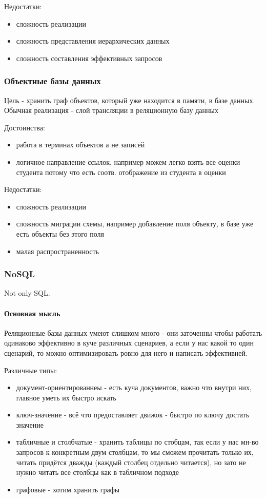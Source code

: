 Недостатки:
\begin{itemize}
    \item сложность реализации
    \item сложность представления иерархических данных
    \item сложность составления эффективных запросов
\end{itemize}

\subsubsection{Объектные базы данных}
Цель - хранить граф объектов, который уже находится
в памяти, в базе данных. Обычная реализация - слой
трансляции в реляционную базу данных

\enewline

Достоинства:
\begin{itemize}
    \item работа в терминах объектов а не записей
    \item логичное направление ссылок, например
можем легко взять все оценки студента потому что есть
соотв. отображение из студента в оценки
\end{itemize}

Недостатки:
\begin{itemize}
    \item сложность реализации
    \item сложность миграции схемы, например добавление
поля объекту, в базе уже есть объекты без этого поля
    \item малая распространенность
\end{itemize}

\subsubsection{NoSQL}
Not only SQL. \\
\paragraph{Основная мысль}
Реляционные базы данных умеют слишком много - они заточенны чтобы работать одинаково
эффективно в куче различных сценариев, а если у нас какой то один сценарий, то можно
оптимизировать ровно для него и написать эффективней.

\enewline

Различные типы:
\begin{itemize}
    \item  документ-ориентированнеы - есть куча документов, важно что внутри них, главное
уметь их быстро искать
    \item ключ-значение - всё что предоставляет движок - быстро по ключу достать значение
    \item табличные и столбчатые - хранить таблицы по стобцам, так если у нас мн-во
запросов к конкретным двум столбцам, то мы сможем прочитать только их, читать придётся
дважды (каждый столбец отдельно читается), но зато не нужно читать все столбцы как в
табличном подходе
    \item графовые - хотим хранить графы
\end{itemize}

